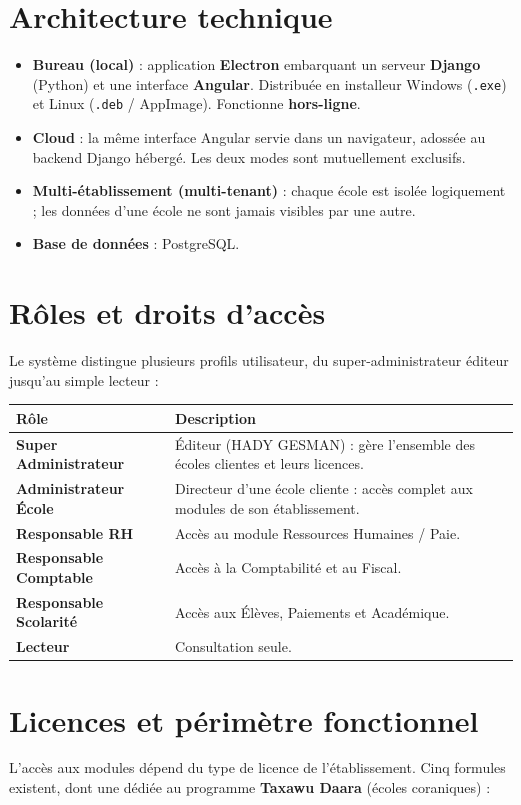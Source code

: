 \documentclass[11pt,a4paper]{report}
\newcommand{\feat}[1]{\item #1}
\begin{document}
\section{Architecture technique}
\begin{itemize}
\feat{\textbf{Bureau (local)} : application \textbf{Electron} embarquant un
serveur \textbf{Django} (Python) et une interface \textbf{Angular}. Distribuée
en installeur Windows (\texttt{.exe}) et Linux (\texttt{.deb} / AppImage).
Fonctionne \textbf{hors-ligne}.}
\feat{\textbf{Cloud} : la même interface Angular servie dans un navigateur,
adossée au backend Django hébergé. Les deux modes sont mutuellement exclusifs.}
\feat{\textbf{Multi-établissement (multi-tenant)} : chaque école est isolée
logiquement ; les données d'une école ne sont jamais visibles par une autre.}
\feat{\textbf{Base de données} : PostgreSQL.}
\end{itemize}

\section{Rôles et droits d'accès}
Le système distingue plusieurs profils utilisateur, du super-administrateur
éditeur jusqu'au simple lecteur :

\begin{center}
\begin{tabularx}{\textwidth}{>{\bfseries}l X}
\toprule
Rôle & Description \\
\midrule
Super Administrateur & Éditeur (HADY GESMAN) : gère l'ensemble des écoles clientes et leurs licences. \\
Administrateur École & Directeur d'une école cliente : accès complet aux modules de son établissement. \\
Responsable RH & Accès au module Ressources Humaines / Paie. \\
Responsable Comptable & Accès à la Comptabilité et au Fiscal. \\
Responsable Scolarité & Accès aux Élèves, Paiements et Académique. \\
Lecteur & Consultation seule. \\
\bottomrule
\end{tabularx}
\end{center}

\section{Licences et périmètre fonctionnel}
L'accès aux modules dépend du type de licence de l'établissement. Cinq formules
existent, dont une dédiée au programme \textbf{Taxawu Daara} (écoles coraniques) :
\end{document}
